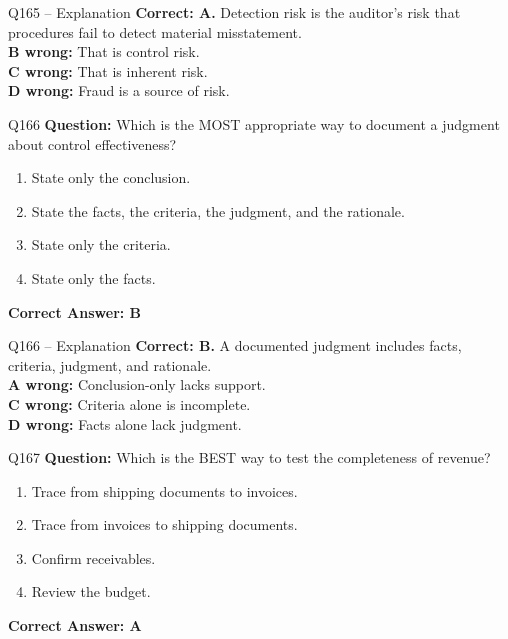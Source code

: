\documentclass[aspectratio=169,10pt]{beamer}
\begin{document}
	\begin{frame}[t]{Q165 -- Explanation}
		\small
		\textbf{Correct: A.} Detection risk is the auditor's risk that procedures fail to detect material misstatement. \\[4pt]
		\textbf{B wrong:} That is control risk. \\[2pt]
		\textbf{C wrong:} That is inherent risk. \\[2pt]
		\textbf{D wrong:} Fraud is a source of risk.
	\end{frame}
	
	\begin{frame}[t]{Q166}
		\small
		\textbf{Question:} Which is the MOST appropriate way to document a judgment about control effectiveness?
		\begin{enumerate}[label=\Alph*.,itemsep=1pt,topsep=2pt]
			\item State only the conclusion.
			\item State the facts, the criteria, the judgment, and the rationale.
			\item State only the criteria.
			\item State only the facts.
		\end{enumerate}
		\vspace{4pt}
		\textbf{Correct Answer: B}
	\end{frame}
	
	\begin{frame}[t]{Q166 -- Explanation}
		\small
		\textbf{Correct: B.} A documented judgment includes facts, criteria, judgment, and rationale. \\[4pt]
		\textbf{A wrong:} Conclusion-only lacks support. \\[2pt]
		\textbf{C wrong:} Criteria alone is incomplete. \\[2pt]
		\textbf{D wrong:} Facts alone lack judgment.
	\end{frame}
	
	\begin{frame}[t]{Q167}
		\small
		\textbf{Question:} Which is the BEST way to test the completeness of revenue?
		\begin{enumerate}[label=\Alph*.,itemsep=1pt,topsep=2pt]
			\item Trace from shipping documents to invoices.
			\item Trace from invoices to shipping documents.
			\item Confirm receivables.
			\item Review the budget.
		\end{enumerate}
		\vspace{4pt}
		\textbf{Correct Answer: A}
	\end{frame}
	
\end{document}
